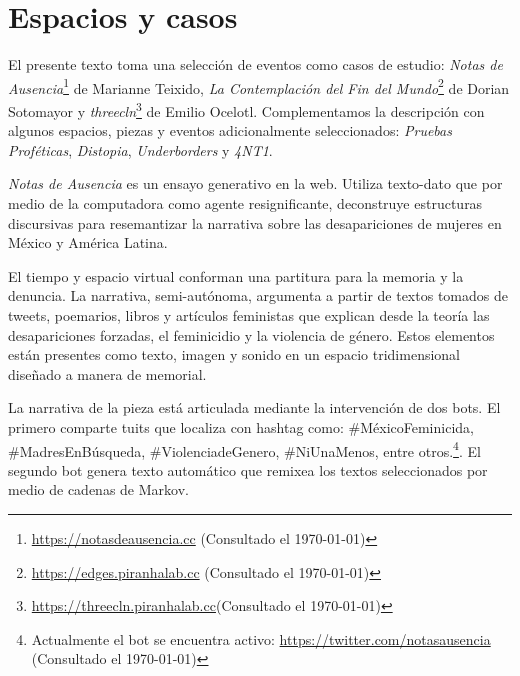 
\section*{Espacios y casos} %

El presente texto toma una selección de eventos como casos de estudio: \textit{Notas de Ausencia}\footnote{\url{https://notasdeausencia.cc} (Consultado el \today)} de Marianne Teixido, \textit{La Contemplación del Fin del Mundo}\footnote{\url{https://edges.piranhalab.cc} (Consultado el \today)} de Dorian Sotomayor y \textit{threecln}\footnote{\url{https://threecln.piranhalab.cc}(Consultado el \today)} de Emilio Ocelotl. Complementamos la descripción con algunos espacios, piezas y eventos adicionalmente seleccionados: \textit{Pruebas Proféticas}, \textit{Distopia}, \textit{Underborders} y \textit{4NT1}. %



\textit{Notas de Ausencia} \citep{notasdeausencia} es un ensayo generativo en la web. Utiliza texto-dato que por medio de la computadora como agente resignificante, deconstruye estructuras discursivas para resemantizar la narrativa sobre las desapariciones de mujeres en México y América Latina.

El tiempo y espacio virtual conforman una partitura para la memoria y la denuncia. La narrativa, semi-autónoma, argumenta a partir de textos tomados de tweets, poemarios, libros y artículos feministas que explican desde la teoría las desapariciones forzadas, el feminicidio y la violencia de género. Estos elementos están presentes como texto, imagen y sonido en un espacio tridimensional diseñado a manera de memorial.

La narrativa de la pieza está articulada mediante la intervención de dos bots. El primero comparte tuits que localiza con hashtag como: \#MéxicoFeminicida, \#MadresEnBúsqueda, \#ViolenciadeGenero, \#NiUnaMenos, entre otros.\footnote{Actualmente el bot se encuentra activo: \url{https://twitter.com/notasausencia} (Consultado el \today)}. El segundo bot genera texto automático que remixea los textos seleccionados por medio de cadenas de Markov.


